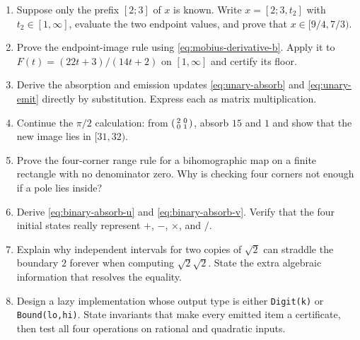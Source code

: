 \begin{exercisebox}
\begin{enumerate}
  \item Suppose only the prefix $[2;3]$ of $x$ is known.  Write
  $x=[2;3,t_2]$ with $t_2\in[1,\infty]$, evaluate the two endpoint values,
  and prove that $x\in[9/4,7/3)$. 

  \item Prove the endpoint-image rule using
  \eqref{eq:mobius-derivative-b}.  Apply it to
  $F(t)=(22t+3)/(14t+2)$ on $[1,\infty]$ and certify its floor.

  \item Derive the absorption and emission updates
  \eqref{eq:unary-absorb} and \eqref{eq:unary-emit} directly by
  substitution.  Express each as matrix multiplication. 

  \item Continue the $\pi/2$ calculation: from
  $\begin{psmallmatrix}2&0\\0&1\end{psmallmatrix}$, absorb $15$ and $1$ and
  show that the new image lies in $[31,32)$. 

  \item Prove the four-corner range rule for a bihomographic map on a finite
  rectangle with no denominator zero.  Why is checking four corners not enough
  if a pole lies inside? 

  \item Derive \eqref{eq:binary-absorb-u} and
  \eqref{eq:binary-absorb-v}.  Verify that the four initial states really
  represent $+$, $-$, $\times$, and $/$. 

  \item Explain why independent intervals for two copies of $\sqrt2$ can
  straddle the boundary $2$ forever when computing $\sqrt2\sqrt2$.  State the
  extra algebraic information that resolves the equality. 

  \item Design a lazy implementation whose output type is either
  \texttt{Digit(k)} or \texttt{Bound(lo,hi)}.  State invariants that make every
  emitted item a certificate, then test all four operations on rational and
  quadratic inputs. 
\end{enumerate}
\end{exercisebox}
